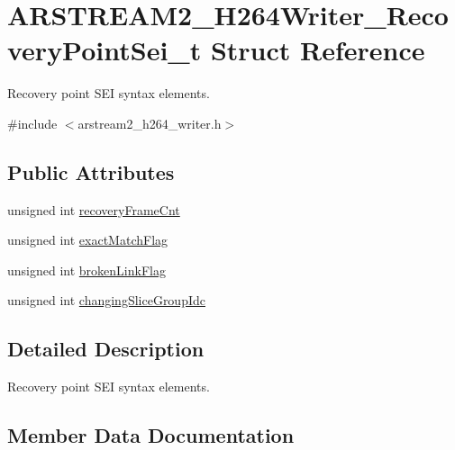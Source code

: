 \hypertarget{struct_a_r_s_t_r_e_a_m2___h264_writer___recovery_point_sei__t}{}\section{A\+R\+S\+T\+R\+E\+A\+M2\+\_\+\+H264\+Writer\+\_\+\+Recovery\+Point\+Sei\+\_\+t Struct Reference}
\label{struct_a_r_s_t_r_e_a_m2___h264_writer___recovery_point_sei__t}


Recovery point S\+EI syntax elements.  




{\ttfamily \#include $<$arstream2\+\_\+h264\+\_\+writer.\+h$>$}

\subsection*{Public Attributes}
\begin{DoxyCompactItemize}
\item 
unsigned int \hyperlink{struct_a_r_s_t_r_e_a_m2___h264_writer___recovery_point_sei__t_ae31b048f103a14087cf1c1e2cea1f816}{recovery\+Frame\+Cnt}
\item 
unsigned int \hyperlink{struct_a_r_s_t_r_e_a_m2___h264_writer___recovery_point_sei__t_a2b57a5168674d561600f5839c614065f}{exact\+Match\+Flag}
\item 
unsigned int \hyperlink{struct_a_r_s_t_r_e_a_m2___h264_writer___recovery_point_sei__t_ad0decf7bff12b6c96b4a0c62b9f2dbf0}{broken\+Link\+Flag}
\item 
unsigned int \hyperlink{struct_a_r_s_t_r_e_a_m2___h264_writer___recovery_point_sei__t_ab4b32483994aeae4eb61e5420405324f}{changing\+Slice\+Group\+Idc}
\end{DoxyCompactItemize}


\subsection{Detailed Description}
Recovery point S\+EI syntax elements. 

\subsection{Member Data Documentation}
